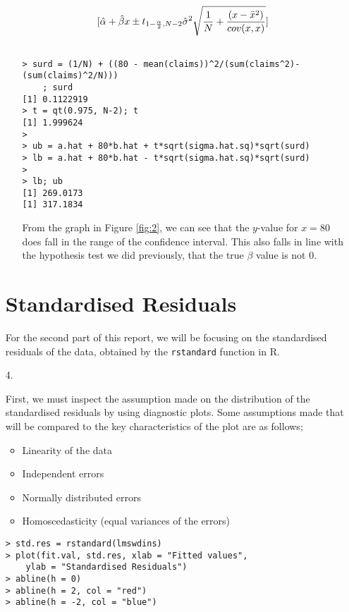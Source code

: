 \documentclass[11pt,a4]{article}
\begin{document}
\begin{itemize}
\begin{itemize}
\[ [ \hat{\alpha}+ \hat{\beta} x \pm t_{1 - \frac{\alpha}{2}, N-2}\hat{\sigma}^2\sqrt{\frac{1}{N}+\frac{(x - \Bar{x}^2)}{cov(x,x)}} ]\]
 
    \begin{verbatim}

> surd = (1/N) + ((80 - mean(claims))^2/(sum(claims^2)-(sum(claims)^2/N))) 
    ; surd
[1] 0.1122919
> t = qt(0.975, N-2); t
[1] 1.999624
> 
> ub = a.hat + 80*b.hat + t*sqrt(sigma.hat.sq)*sqrt(surd)
> lb = a.hat + 80*b.hat - t*sqrt(sigma.hat.sq)*sqrt(surd)
> 
> lb; ub
[1] 269.0173
[1] 317.1834
    \end{verbatim}

From the graph in Figure \ref{fig:2}, we can see that the $y$-value for $x = 80$ does fall in the range of the confidence interval. This also falls in line with the hypothesis test we did previously, that the true $\beta$ value is not 0. 

\end{itemize}

\section{Standardised Residuals}

For the second part of this report, we will be focusing on the standardised residuals of the data, obtained by the \verb|rstandard| function in R.

\item[4.]

First, we must inspect the assumption made on the distribution of the standardised residuals by using diagnostic plots. Some assumptions made that will be compared to the key characteristics of the plot are as follows;

\begin{itemize}
    \item Linearity of the data
    \item Independent errors
    \item Normally distributed errors
    \item Homoscedasticity (equal variances of the errors)
\end{itemize}

\begin{verbatim}
> std.res = rstandard(lmswdins)
> plot(fit.val, std.res, xlab = "Fitted values", 
    ylab = "Standardised Residuals")
> abline(h = 0)
> abline(h = 2, col = "red")
> abline(h = -2, col = "blue")
\end{verbatim}


\end{itemize}
\end{document}
